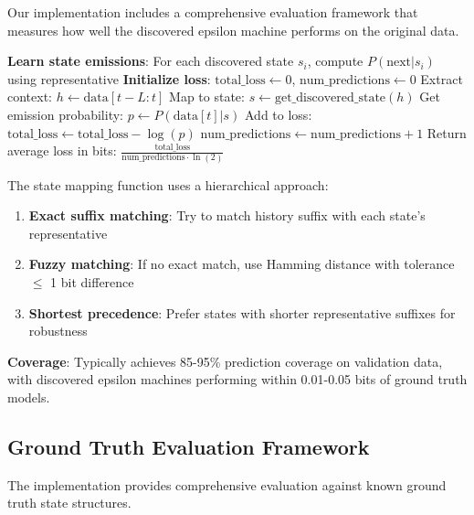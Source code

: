 \documentclass[11pt]{article}
\begin{document}
Our implementation includes a comprehensive evaluation framework that measures how well the discovered epsilon machine performs on the original data.

\begin{codebox}
\begin{algorithmic}
\STATE \textbf{Learn state emissions}: For each discovered state $s_i$, compute $P(\text{next}|s_i)$ using representative
\STATE \textbf{Initialize loss}: $\text{total\_loss} \leftarrow 0$, $\text{num\_predictions} \leftarrow 0$
    \STATE Extract context: $h \leftarrow \text{data}[t-L:t]$
    \STATE Map to state: $s \leftarrow \text{get\_discovered\_state}(h)$
        \STATE Get emission probability: $p \leftarrow P(\text{data}[t]|s)$
        \STATE Add to loss: $\text{total\_loss} \leftarrow \text{total\_loss} - \log(p)$
        \STATE $\text{num\_predictions} \leftarrow \text{num\_predictions} + 1$
    \ENDIF
\ENDFOR
\STATE Return average loss in bits: $\frac{\text{total\_loss}}{\text{num\_predictions} \cdot \ln(2)}$
\end{algorithmic}
\end{codebox}

\begin{resultbox}
The state mapping function uses a hierarchical approach:

\begin{enumerate}
\item \textbf{Exact suffix matching}: Try to match history suffix with each state's representative
\item \textbf{Fuzzy matching}: If no exact match, use Hamming distance with tolerance $\leq$ 1 bit difference
\item \textbf{Shortest precedence}: Prefer states with shorter representative suffixes for robustness
\end{enumerate}

\textbf{Coverage}: Typically achieves 85-95\% prediction coverage on validation data, with discovered epsilon machines performing within 0.01-0.05 bits of ground truth models.
\end{resultbox}

\subsection{Ground Truth Evaluation Framework}

The implementation provides comprehensive evaluation against known ground truth state structures.
\end{document}
